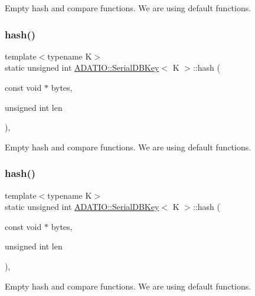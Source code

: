 Empty hash and compare functions. We are using default functions. \mbox{\label{classADATIO_1_1SerialDBKey_a09904405d7dc203997431c6ca8af87ae}} 
\subsubsection{\texorpdfstring{hash()}{hash()}\hspace{0.1cm}{\footnotesize\ttfamily [2/3]}}
{\footnotesize\ttfamily template$<$typename K$>$ \\
static unsigned int \mbox{\hyperlink{classADATIO_1_1SerialDBKey}{A\+D\+A\+T\+I\+O\+::\+Serial\+D\+B\+Key}}$<$ K $>$\+::hash (\begin{DoxyParamCaption}\item[{const void $\ast$}]{bytes,  }\item[{unsigned int}]{len }\end{DoxyParamCaption})\hspace{0.3cm}{\ttfamily [inline]}, {\ttfamily [static]}}

Empty hash and compare functions. We are using default functions. \mbox{\label{classADATIO_1_1SerialDBKey_a09904405d7dc203997431c6ca8af87ae}} 
\subsubsection{\texorpdfstring{hash()}{hash()}\hspace{0.1cm}{\footnotesize\ttfamily [3/3]}}
{\footnotesize\ttfamily template$<$typename K$>$ \\
static unsigned int \mbox{\hyperlink{classADATIO_1_1SerialDBKey}{A\+D\+A\+T\+I\+O\+::\+Serial\+D\+B\+Key}}$<$ K $>$\+::hash (\begin{DoxyParamCaption}\item[{const void $\ast$}]{bytes,  }\item[{unsigned int}]{len }\end{DoxyParamCaption})\hspace{0.3cm}{\ttfamily [inline]}, {\ttfamily [static]}}

Empty hash and compare functions. We are using default functions. \mbox{\label{classADATIO_1_1SerialDBKey_ae8926cd9bdef006f3729f4b724a2e2fe}} 
